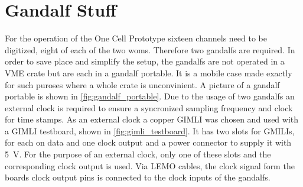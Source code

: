 \section{Gandalf Stuff}

For the operation of the One Cell Prototype sixteen channels need to be digitized, eight of each of the two \acp{wom}.
Therefore two \acp{gandalf} are required.
In order to save place and simplify the setup, the \acp{gandalf} are not operated in a VME crate but are each in a \ac{gandalf} portable.
It is a mobile case made exactly for such puroses where a whole crate is unconvinient.
A picture of a \ac{gandalf} portable is shown in \autoref{fig:gandalf_portable}.
Due to the usage of two \acp{gandalf} an external clock is required to ensure a syncronized sampling frequency and clock for time stamps.
As an external clock a copper GIMLI was chosen and used with a GIMLI testboard, shown in \autoref{fig:gimli_testboard}.
It has two slots for GMILIs, for each on data and one clock output and a power connector to supply it with \SI{5}{\volt}.
For the purpose of an external clock, only one of these slots and the corresponding clock output is used.
Via LEMO cables, the clock signal form the boards clock output pins is connected to the clock inputs of the \acp{gandalf}.


